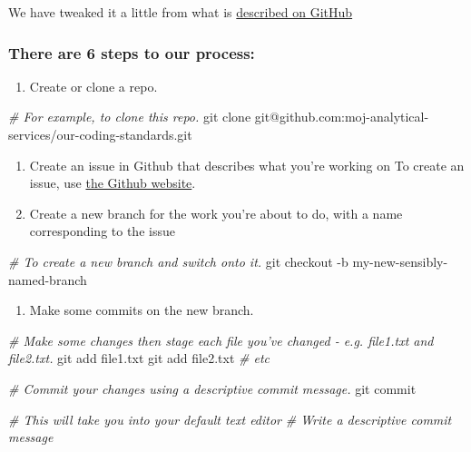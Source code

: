 \documentclass[]{book}
\newenvironment{Shaded}{\begin{snugshade}}{\end{snugshade}}
\newcommand{\CommentTok}[1]{\textcolor[rgb]{0.56,0.35,0.01}{\textit{#1}}}
\newcommand{\FunctionTok}[1]{\textcolor[rgb]{0.00,0.00,0.00}{#1}}
\newcommand{\NormalTok}[1]{#1}
\providecommand{\tightlist}{%
  \setlength{\itemsep}{0pt}\setlength{\parskip}{0pt}}
\begin{document}
We have tweaked it a little from what is \href{https://guides.github.com/introduction/flow/}{described on GitHub}

\hypertarget{there-are-6-steps-to-our-process}{%
\subsubsection*{There are 6 steps to our process:}\label{there-are-6-steps-to-our-process}}

\begin{enumerate}
\def\labelenumi{\arabic{enumi}.}
\tightlist
\item
  Create or clone a repo.
\end{enumerate}

\begin{Shaded}
\begin{Highlighting}[]
\CommentTok{# For example, to clone this repo.}
\FunctionTok{git}\NormalTok{ clone git@github.com:moj-analytical-services/our-coding-standards.git}
\end{Highlighting}
\end{Shaded}

\begin{enumerate}
\def\labelenumi{\arabic{enumi}.}
\setcounter{enumi}{1}
\item
  Create an issue in Github that describes what you're working on
  To create an issue, use \href{https://guides.github.com/features/issues/}{the Github website}.
\item
  Create a new branch for the work you're about to do, with a name corresponding to the issue
\end{enumerate}

\begin{Shaded}
\begin{Highlighting}[]
\CommentTok{# To create a new branch and switch onto it.}
\FunctionTok{git}\NormalTok{ checkout -b my-new-sensibly-named-branch}
\end{Highlighting}
\end{Shaded}

\begin{enumerate}
\def\labelenumi{\arabic{enumi}.}
\setcounter{enumi}{3}
\tightlist
\item
  Make some commits on the new branch.
\end{enumerate}

\begin{Shaded}
\begin{Highlighting}[]
\CommentTok{# Make some changes then stage each file you've changed - e.g. file1.txt and file2.txt.}
\FunctionTok{git}\NormalTok{ add file1.txt}
\FunctionTok{git}\NormalTok{ add file2.txt}
\CommentTok{# etc}

\CommentTok{# Commit your changes using a descriptive commit message.}
\FunctionTok{git}\NormalTok{ commit}

\CommentTok{# This will take you into your default text editor}
\CommentTok{# Write a descriptive commit message}
\end{Highlighting}
\end{Shaded}
\end{document}
